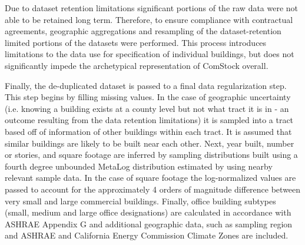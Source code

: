 Due to dataset retention limitations significant portions of the raw data were not able to be retained long term. Therefore, to ensure compliance with contractual agreements, geographic aggregations and resampling of the dataset-retention limited portions of the datasets were performed. This process introduces limitations to the data use for specification of individual buildings, but does not significantly impede the archetypical representation of ComStock overall.

Finally, the de-duplicated dataset is passed to a final data regularization step. This step begins by filling missing values. In the case of geographic uncertainty (i.e. knowing a building exists at a county level but not what tract it is in - an outcome resulting from the data retention limitations) it is sampled into a tract based off of information of other buildings within each tract. It is assumed that similar buildings are likely to be built near each other. Next, year built, number or stories, and square footage are inferred by sampling distributions built using a fourth degree unbounded MetaLog distribution estimated by using nearby relevant sample data. \citep{metalog} In the case of square footage the log-normalized values are passed to account for the approximately 4 orders of magnitude difference between very small and large commercial buildings. Finally, office building subtypes (small, medium and large office designations) are calculated in accordance with ASHRAE Appendix G and additional geographic data, such as sampling region and ASHRAE and California Energy Commission Climate Zones are included. \citep{ashrae_901_2010}

